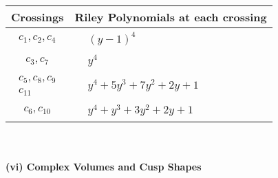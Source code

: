 \documentclass[1p]{elsarticle_modified}
\theoremstyle{definition}
\begin{document}
\begin{tabular}{m{50pt}|m{274pt}}
Crossings & \hspace{64pt}Riley Polynomials at each crossing \\
\hline $$\begin{aligned}c_{1},c_{2},c_{4}\end{aligned}$$&$\begin{aligned}
&(y-1)^4
\end{aligned}$\\
\hline $$\begin{aligned}c_{3},c_{7}\end{aligned}$$&$\begin{aligned}
&y^4
\end{aligned}$\\
\hline $$\begin{aligned}c_{5},c_{8},c_{9}\\c_{11}\end{aligned}$$&$\begin{aligned}
&y^4+5 y^3+7 y^2+2 y+1
\end{aligned}$\\
\hline $$\begin{aligned}c_{6},c_{10}\end{aligned}$$&$\begin{aligned}
&y^4+y^3+3 y^2+2 y+1
\end{aligned}$\\
\hline
\end{tabular}\\~\\
\newpage\flushleft \textbf{(vi) Complex Volumes and Cusp Shapes}
\end{document}
